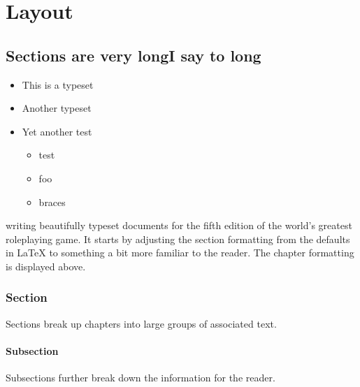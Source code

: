\documentclass[letterpaper,twocolumn,openany,nodeprecatedcode]{wfrpgdoc}
\begin{document}
\DndMakeCover[
    image = img/cover_revoy,
    logo = img/wfrpg_fan_gen,
]



\frontmatter

\begin{KeepFromToc}
  \tableofcontents
\end{KeepFromToc}

\mainmatter%

\part{Layout}





\chapter[Sections]{Sections are very long\newline I say to long}

\begin{itemize}[label=\skull]
\item This is a typeset
\item Another typeset
\item Yet another test 
\begin{itemize}[label=\skull]
\item test
\item foo
\item braces
\end{itemize}
\end{itemize}

 writing beautifully typeset documents for the fifth edition of the world's greatest roleplaying game. It starts by adjusting the section formatting from the defaults in \LaTeX{} to something a bit more familiar to the reader. The chapter formatting is displayed above.

\section{Section}
Sections break up chapters into large groups of associated text. \skull

\subsection{Subsection}
Subsections further break down the information for the reader.
\end{document}
